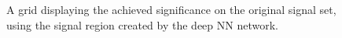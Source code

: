 \begin{figure}
    \caption{A grid displaying the achieved significance on the original signal set, using the signal region 
    created by the deep \ac{NN} network.}
    \label{fig:NNGridSig}
\end{figure}

